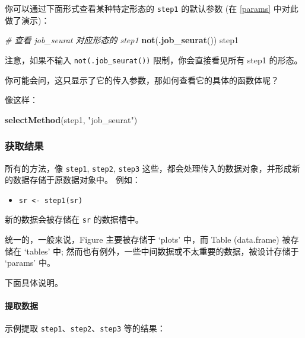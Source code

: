 \documentclass[
]{article}
\newenvironment{Shaded}{\begin{snugshade}}{\end{snugshade}}
\newcommand{\CommentTok}[1]{\textcolor[rgb]{0.56,0.35,0.01}{\textit{#1}}}
\newcommand{\KeywordTok}[1]{\textcolor[rgb]{0.13,0.29,0.53}{\textbf{#1}}}
\newcommand{\NormalTok}[1]{#1}
\newcommand{\StringTok}[1]{\textcolor[rgb]{0.31,0.60,0.02}{#1}}
\providecommand{\tightlist}{%
  \setlength{\itemsep}{0pt}\setlength{\parskip}{0pt}}
\begin{document}
你可以通过下面形式查看某种特定形态的 \texttt{step1} 的默认参数 (在 \ref{params} 中对此做了演示)：

\begin{Shaded}
\begin{Highlighting}[]
\CommentTok{\# 查看 \textquotesingle{}job\_seurat\textquotesingle{} 对应形态的 step1}
\KeywordTok{not}\NormalTok{(}\KeywordTok{.job\_seurat}\NormalTok{())}
\NormalTok{step1}
\end{Highlighting}
\end{Shaded}

注意，如果不输入 \texttt{not(.job\_seurat())} 限制，你会直接看见所有 step1 的形态。

你可能会问，这只显示了它的传入参数，那如何查看它的具体的函数体呢？

像这样：

\begin{Shaded}
\begin{Highlighting}[]
\KeywordTok{selectMethod}\NormalTok{(step1, }\StringTok{"job\_seurat"}\NormalTok{)}
\end{Highlighting}
\end{Shaded}

\hypertarget{ux83b7ux53d6ux7ed3ux679c}{%
\subsubsection{获取结果}\label{ux83b7ux53d6ux7ed3ux679c}}

所有的方法，像 \texttt{step1}, \texttt{step2}, \texttt{step3} 这些，都会处理传入的数据对象，并形成新的数据存储于原数据对象中。
例如：

\begin{itemize}
\tightlist
\item
  \texttt{sr\ \textless{}-\ step1(sr)}
\end{itemize}

新的数据会被存储在 \texttt{sr} 的数据槽中。

统一的，一般来说，Figure 主要被存储于 `plots' 中，而 Table (data.frame) 被存储在 `tables' 中;
然而也有例外，一些中间数据或不太重要的数据，被设计存储于 `params' 中。

下面具体说明。

\hypertarget{get}{%
\paragraph{提取数据}\label{get}}

示例提取 \texttt{step1}、\texttt{step2}、\texttt{step3} 等的结果：
\end{document}
